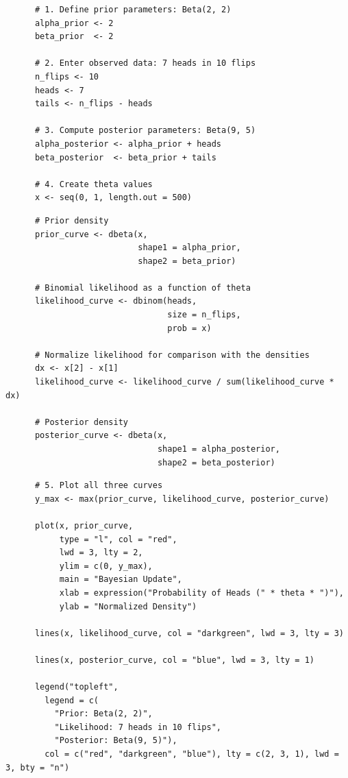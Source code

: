 \documentclass[aspectratio=43,11pt]{beamer}
\begin{document}
  \begin{frame}[fragile]{}
    \begin{verbatim}
      # 1. Define prior parameters: Beta(2, 2)
      alpha_prior <- 2
      beta_prior  <- 2
      
      # 2. Enter observed data: 7 heads in 10 flips
      n_flips <- 10
      heads <- 7
      tails <- n_flips - heads
      
      # 3. Compute posterior parameters: Beta(9, 5)
      alpha_posterior <- alpha_prior + heads
      beta_posterior  <- beta_prior + tails
      
      # 4. Create theta values
      x <- seq(0, 1, length.out = 500)
    \end{verbatim}
  \end{frame}

  \begin{frame}[fragile]{}
    \begin{verbatim}
      # Prior density
      prior_curve <- dbeta(x,
                           shape1 = alpha_prior,
                           shape2 = beta_prior)
      
      # Binomial likelihood as a function of theta
      likelihood_curve <- dbinom(heads,
                                 size = n_flips,
                                 prob = x)
      
      # Normalize likelihood for comparison with the densities
      dx <- x[2] - x[1]
      likelihood_curve <- likelihood_curve / sum(likelihood_curve * dx)
      
      # Posterior density
      posterior_curve <- dbeta(x,
                               shape1 = alpha_posterior,
                               shape2 = beta_posterior)
    \end{verbatim}
  \end{frame}

  \begin{frame}[fragile]{}
    \begin{verbatim}
      # 5. Plot all three curves
      y_max <- max(prior_curve, likelihood_curve, posterior_curve)
      
      plot(x, prior_curve,
           type = "l", col = "red",
           lwd = 3, lty = 2,
           ylim = c(0, y_max),
           main = "Bayesian Update",
           xlab = expression("Probability of Heads (" * theta * ")"),
           ylab = "Normalized Density")
      
      lines(x, likelihood_curve, col = "darkgreen", lwd = 3, lty = 3)
      
      lines(x, posterior_curve, col = "blue", lwd = 3, lty = 1)
      
      legend("topleft",
        legend = c(
          "Prior: Beta(2, 2)",
          "Likelihood: 7 heads in 10 flips",
          "Posterior: Beta(9, 5)"),
        col = c("red", "darkgreen", "blue"), lty = c(2, 3, 1), lwd = 3, bty = "n")
    \end{verbatim}
  \end{frame}
\end{document}
